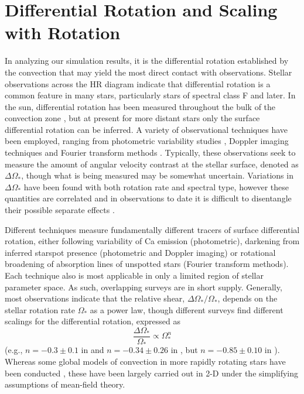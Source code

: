 \section{Differential Rotation and Scaling with Rotation}
\label{sec:DR}
\label{sec:global scale flows}
In analyzing our simulation results, it is the differential rotation
established by the convection that may yield the most direct contact
with observations.
Stellar observations across the HR diagram indicate that differential
rotation is a common feature in many stars, particularly stars of
spectral class F and later.  In the sun, differential rotation has
been measured throughout the bulk of the convection zone
\citep[as reviewed by][]{Thompson_et_al_2003}, 
but at present for more distant stars only
the surface differential rotation can be inferred.
A variety of observational techniques have been
employed, ranging from photometric variability studies
\citep[e.g.,][]{Donahue_et_al_1996,Walker_et_al_2007}, Doppler imaging
techniques \citep[e.g.,][]{Donati_et_al_2003} and Fourier transform methods
\citep[e.g.,][]{Reiners&Schmitt_2003}.  Typically, these observations seek to measure
the amount of angular velocity contrast at the stellar surface, 
denoted as $\Delta\Omega_*$, though what is being measured may be
somewhat uncertain.  Variations in
$\Delta\Omega_*$ have been found with both rotation rate and spectral
type, however these quantities are correlated and in observations to
date it is difficult to disentangle their possible separate effects 
\citep{Reiners_2006}. 

Different techniques measure fundamentally different tracers of
surface differential rotation, either following variability of
Ca emission (photometric), darkening from inferred starspot presence
(photometric and Doppler imaging) or rotational broadening of absorption lines of
unspotted stars (Fourier transform methods).  Each technique also is most applicable
in only a limited region of stellar parameter space.  As such,
overlapping surveys are in short supply.  Generally,
most observations indicate that the relative
shear, $\Delta\Omega_*/\Omega_*$, depends on the stellar rotation rate
$\Omega_*$ as a power law, though different surveys find different
scalings for the differential rotation, expressed as
\begin{equation}
  \frac{\Delta\Omega_*}{\Omega_*} \propto \Omega_*^n
  \label{eq:relative_contrast}
\end{equation}
(e.g., $n=-0.3\pm0.1$ in \citealt{Donahue_et_al_1996} and 
$n=-0.34\pm 0.26$ in \citealt{Reiners&Schmitt_2003}, but 
$n=-0.85\pm0.10$ in \citealt{Barnes_et_al_2005}). 
Whereas some global models of convection in more rapidly rotating stars have 
been conducted \citep[e.g.,][]{Rudiger_et_al_1998, Kuker&Stix_2001,
  Kuker&Rudiger_2005_A&A, Kuker&Rudiger_2005_AN},
these have been largely carried out in 2-D under the simplifying assumptions
of mean-field theory.

